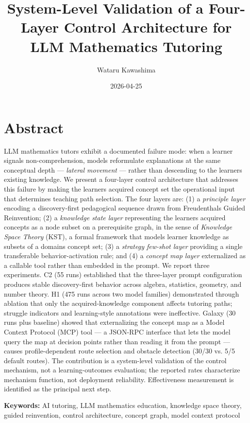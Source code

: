 \documentclass[
]{article}
\title{System-Level Validation of a Four-Layer Control Architecture for LLM Mathematics Tutoring}
\author{Wataru Kawashima}
\date{2026-04-25}
\begin{document}
\maketitle

\section{Abstract}\label{abstract}

LLM mathematics tutors exhibit a documented failure mode: when a learner signals non-comprehension, models reformulate explanations at the same conceptual depth --- \emph{lateral movement} --- rather than descending to the learner\textquotesingle s existing knowledge. We present a four-layer control architecture that addresses this failure by making the learner\textquotesingle s acquired concept set the operational input that determines teaching path selection. The four layers are: (1) a \emph{principle layer} encoding a discovery-first pedagogical sequence drawn from Freudenthal\textquotesingle s Guided Reinvention; (2) a \emph{knowledge state layer} representing the learner\textquotesingle s acquired concepts as a node subset on a prerequisite graph, in the sense of \emph{Knowledge Space Theory} (KST), a formal framework that models learner knowledge as subsets of a domain\textquotesingle s concept set; (3) a \emph{strategy few-shot layer} providing a single transferable behavior-activation rule; and (4) a \emph{concept map layer} externalized as a callable tool rather than embedded in the prompt. We report three experiments. C2 (55 runs) established that the three-layer prompt configuration produces stable discovery-first behavior across algebra, statistics, geometry, and number theory. H1 (475 runs across two model families) demonstrated through ablation that only the acquired-knowledge component affects tutoring paths; struggle indicators and learning-style annotations were ineffective. Galaxy (30 runs plus baseline) showed that externalizing the concept map as a Model Context Protocol (MCP) tool --- a JSON-RPC interface that lets the model query the map at decision points rather than reading it from the prompt --- causes profile-dependent route selection and obstacle detection (30/30 vs. 5/5 default routes). The contribution is a system-level validation of the control mechanism, not a learning-outcomes evaluation; the reported rates characterize mechanism function, not deployment reliability. Effectiveness measurement is identified as the principal next step.

\textbf{Keywords:} AI tutoring, LLM mathematics education, knowledge space theory, guided reinvention, control architecture, concept graph, model context protocol
\end{document}
